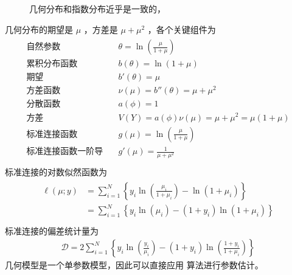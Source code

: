\documentclass[letterpaper,10pt,english]{sphinxmanual}
\begin{document}
\begin{figure}[htbp]
\centering
\capstart

\noindent{}
\caption{几何分布和指数分布近乎是一致的，}\label{\detokenize{_u8d1f_u4e8c_u9879_u6a21_u578b/content:id21}}\label{\detokenize{_u8d1f_u4e8c_u9879_u6a21_u578b/content:fg-nb-geometric}}\end{figure}

几何分布的期望是 \(\mu\)
，方差是 \(\mu+\mu^2\)
，各个关键组件为
\begin{align}\label{equation:负二项模型/content:负二项模型/content:25}\!\begin{aligned}
\text{自然参数} & \quad \theta = \ln \left (\frac{ \mu}{1+ \mu} \right )\\
\text{累积分布函数} & \quad b(\theta) =  \ln (1+\mu)\\
\text{期望} & \quad b'(\theta) =  \mu\\
\text{方差函数} & \quad \nu(\mu) = b''(\theta) =  \mu +  \mu^2\\
\text{分散函数} & \quad a(\phi) = 1\\
\text{方差} & \quad V(Y) =  a(\phi)\nu(\mu) = \mu + \mu^2 = \mu(1+\mu)\\
\text{标准连接函数} & \quad g(\mu) = \ln \left (\frac{ \mu}{1+ \mu} \right )\\
\text{标准连接函数一阶导}  & \quad g'(\mu) = \frac{1}{\mu+ \mu^2}\\
\end{aligned}\end{align}
标准连接的对数似然函数为
\begin{align}\label{equation:负二项模型/content:负二项模型/content:26}\!\begin{aligned}
\ell(\mu;y)
&= \sum_{i=1}^N \left \{
y_i \ln  \left (\frac{\mu_i}{1+\mu_i}  \right  )-  \ln (1+\mu_i)
\right \}\\
&=\sum_{i=1}^N \left \{
y_i \ln (\mu_i) - (1+y_i) \ln (1+\mu_i)
\right \}\\
\end{aligned}\end{align}
标准连接的偏差统计量为
\begin{equation}\label{equation:负二项模型/content:负二项模型/content:27}
\begin{split}\mathcal{D} =2\sum_{i=1}^N \left \{
y_i \ln \left (\frac{y_i}{\mu_i} \right )
-(1+y_i) \ln \left ( \frac{1+y_i}{1+\mu_i} \right )
\right \}\end{split}
\end{equation}
几何模型是一个单参数模型，因此可以直接应用 
算法进行参数估计。
\end{document}
